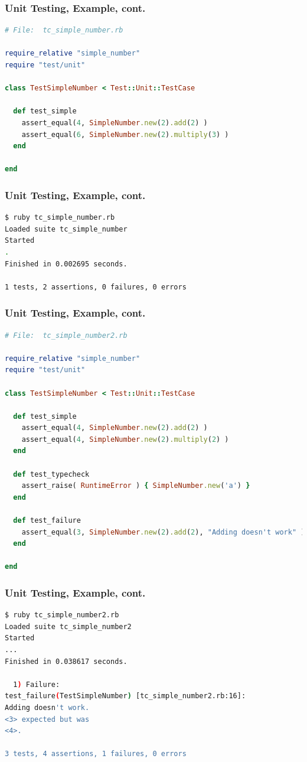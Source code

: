 \documentclass{beamer}
\begin{document}
\begin{frame}[fragile]\frametitle{Unit Testing, Example, cont.} 
  \begin{lstlisting}[language=ruby, escapechar={^}]
# File:  tc_simple_number.rb
 
require_relative "simple_number"
require "test/unit"
 
class TestSimpleNumber < Test::Unit::TestCase
 
  def test_simple
    assert_equal(4, SimpleNumber.new(2).add(2) )
    assert_equal(6, SimpleNumber.new(2).multiply(3) )
  end
 
end
  \end{lstlisting}
\end{frame}



\begin{frame}[fragile]\frametitle{Unit Testing, Example, cont.} 
  \begin{lstlisting}[language=bash, escapechar={^}]
$ ruby tc_simple_number.rb
Loaded suite tc_simple_number
Started
.
Finished in 0.002695 seconds.

1 tests, 2 assertions, 0 failures, 0 errors
  \end{lstlisting}
\end{frame}



\begin{frame}[fragile]\frametitle{Unit Testing, Example, cont.} 
  \begin{lstlisting}[language=ruby, escapechar={^}]
# File:  tc_simple_number2.rb
 
require_relative "simple_number"
require "test/unit"
 
class TestSimpleNumber < Test::Unit::TestCase
 
  def test_simple
    assert_equal(4, SimpleNumber.new(2).add(2) )
    assert_equal(4, SimpleNumber.new(2).multiply(2) )
  end
 
  def test_typecheck
    assert_raise( RuntimeError ) { SimpleNumber.new('a') }
  end
 
  def test_failure
    assert_equal(3, SimpleNumber.new(2).add(2), "Adding doesn't work" )
  end
 
end
  \end{lstlisting}
\end{frame}



\begin{frame}[fragile]\frametitle{Unit Testing, Example, cont.} 
  \begin{lstlisting}[language=bash, escapechar={^}]
$ ruby tc_simple_number2.rb
Loaded suite tc_simple_number2
Started
...
Finished in 0.038617 seconds.
 
  1) Failure:
test_failure(TestSimpleNumber) [tc_simple_number2.rb:16]:
Adding doesn't work.
<3> expected but was
<4>.
 
3 tests, 4 assertions, 1 failures, 0 errors
  \end{lstlisting}
\end{frame}
\end{document}
